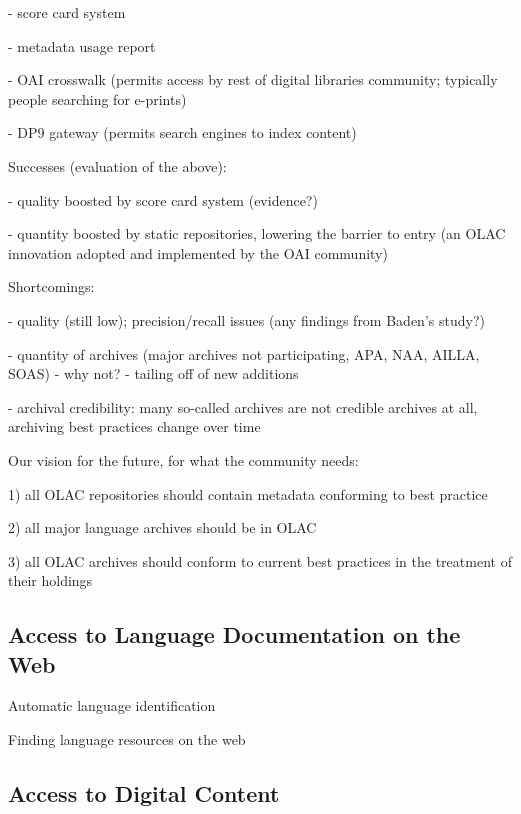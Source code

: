 - score card system

- metadata usage report

- OAI crosswalk (permits access by rest of digital libraries
    community; typically people searching for e-prints)

- DP9 gateway (permits search engines to index content)

\vspace{1in}

Successes (evaluation of the above):

- quality boosted by score card system (evidence?)

- quantity boosted by static repositories, lowering the barrier to entry
  (an OLAC innovation adopted and implemented by the OAI community)

\vspace{1in}

Shortcomings:

- quality (still low); precision/recall issues (any findings from
    Baden's study?)

- quantity of archives (major archives not participating, APA, NAA,
      AILLA, SOAS)
  - why not?
  - tailing off of new additions

- archival credibility:
    many so-called archives are not credible archives at all,
    archiving best practices change over time

\vspace{1in}

Our vision for the future, for what the community needs:

1) all OLAC repositories should contain metadata conforming to
    best practice
 
2) all major language archives should be in OLAC

3) all OLAC archives should conform to current best practices
    in the treatment of their holdings

\vspace{1in}

\subsection{Access to Language Documentation on the Web}

Automatic language identification
\citep{HughesBaldwin06lrec}

Finding language resources on the web
\citep{BaldwinBird06}

\vspace{1in}

\subsection{Access to Digital Content}

\vspace{1in}

